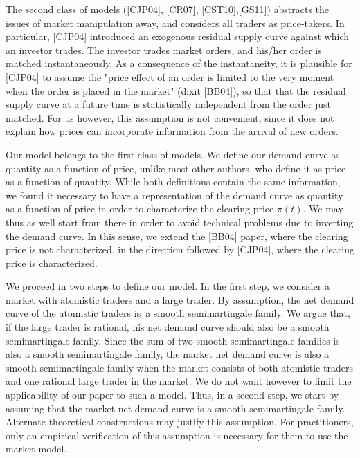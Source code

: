 \documentclass{article}
\begin{document}
The second class of models ([CJP04], [CR07], [CST10],[GS11]) abstracts the
issues of market manipulation away, and considers all traders as
price-takers. In particular, [CJP04] introduced an exogenous residual supply
curve against which an investor trades. The investor trades market orders,
and his/her order is matched instantaneously. As a consequence of the
instantaneity, it is plausible for [CJP04] to assume the "price effect of an
order is limited to the very moment when the order is placed in the market"
(dixit [BB04]), so that that the residual supply curve at a future time is
statistically independent from the order just matched. For us however, this
assumption is not convenient, since it does not explain how prices can
incorporate information from the arrival of new orders.

Our model belongs to the first class of models. We define our demand curve
as quantity as a function of price, unlike most other authors, who define it
as price as a function of quantity. While both definitions contain the same
information, we found it necessary to have a representation of the demand
curve as quantity as a function of price in order to characterize the
clearing price $\pi (t)$. We may thus as well start from there in order to
avoid technical problems due to inverting the demand curve. In this sense,
we extend the [BB04] paper, where the clearing price is not characterized,
in the direction followed by [CJP04], where the clearing price is
characterized.

We proceed in two steps to define our model. In the first step, we consider
a market with atomistic traders and a large trader. By assumption, the net
demand curve of the atomistic traders is\ a smooth semimartingale family. We
argue that, if the large trader is rational, his net demand curve should
also be a smooth semimartingale family. Since the sum of two smooth
semimartingale families is also a smooth semimartingale family, the market
net demand curve is also a smooth semimartingale family when the market
consists of both atomistic traders and one rational large trader in the
market. We do not want however to limit the applicability of our paper to
such a model. Thus, in a second step, we start by assuming that the market
net demand curve is a smooth semimartingale family. Alternate theoretical
constructions may justify this assumption. For practitioners, only an
empirical verification of this assumption is necessary for them to use the
market model.
\end{document}
